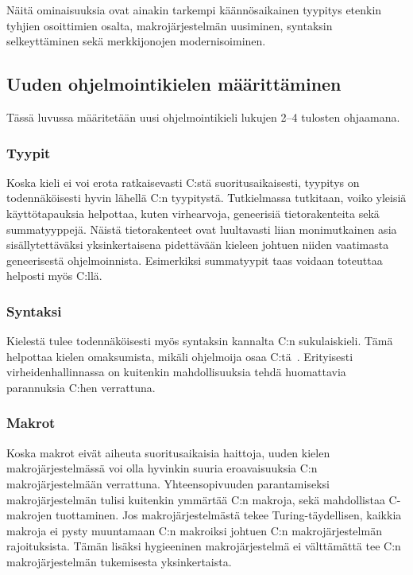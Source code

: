 Näitä ominaisuuksia ovat ainakin tarkempi käännösaikainen tyypitys etenkin
tyhjien osoittimien osalta, makrojärjestelmän uusiminen, syntaksin
selkeyttäminen sekä merkkijonojen modernisoiminen.

\subsection{Uuden ohjelmointikielen määrittäminen}

Tässä luvussa määritetään uusi ohjelmointikieli lukujen 2--4 tulosten
ohjaamana.

\subsubsection{Tyypit}

Koska kieli ei voi erota ratkaisevasti C:stä suoritusaikaisesti, tyypitys on
todennäköisesti hyvin lähellä C:n tyypitystä. Tutkielmassa tutkitaan, voiko
yleisiä käyttötapauksia helpottaa, kuten virhearvoja, geneerisiä
tietorakenteita sekä summatyyppejä. Näistä tietorakenteet ovat luultavasti
liian monimutkainen asia sisällytettäväksi yksinkertaisena pidettävään kieleen
johtuen niiden vaatimasta geneerisestä ohjelmoinnista. Esimerkiksi summatyypit
taas voidaan toteuttaa helposti myös C:llä.

\subsubsection{Syntaksi}

Kielestä tulee todennäköisesti myös syntaksin kannalta C:n sukulaiskieli. Tämä
helpottaa kielen omaksumista, mikäli ohjelmoija osaa
C:tä~\citep{languagelearning}. Erityisesti virheidenhallinnassa on kuitenkin
mahdollisuuksia tehdä huomattavia parannuksia C:hen verrattuna.

\subsubsection{Makrot}

Koska makrot eivät aiheuta suoritusaikaisia haittoja, uuden kielen
makrojärjestelmässä voi olla hyvinkin suuria eroavaisuuksia C:n
makrojärjestelmään verrattuna. Yhteensopivuuden parantamiseksi
makrojärjestelmän tulisi kuitenkin ymmärtää C:n makroja, sekä mahdollistaa
C-makrojen tuottaminen. Jos makrojärjestelmästä tekee Turing-täydellisen,
kaikkia makroja ei pysty muuntamaan C:n makroiksi johtuen C:n makrojärjestelmän
rajoituksista. Tämän lisäksi hygieeninen makrojärjestelmä ei välttämättä tee
C:n makrojärjestelmän tukemisesta yksinkertaista.

